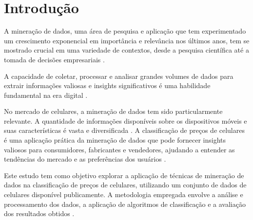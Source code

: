 \documentclass[conference]{IEEEtran}
\begin{document}









\section{Introdução}

A mineração de dados, uma área de pesquisa e aplicação que tem experimentado 
um crescimento exponencial em importância e relevância nos últimos anos, 
tem se mostrado crucial em uma variedade de contextos, 
desde a pesquisa científica até a tomada de decisões 
empresariais \cite{WikipediaDataMining}. 

A capacidade de coletar, processar e analisar grandes volumes de dados para extrair 
informações valiosas e insights significativos é uma habilidade fundamental 
na era digital \cite{Zaki2023}.

No mercado de celulares, a mineração de dados tem sido particularmente relevante. 
A quantidade de informações disponíveis sobre os dispositivos móveis e suas 
características é vasta e diversificada \cite{Statista2023}. 
A classificação de preços de celulares é uma aplicação prática da 
mineração de dados que pode fornecer insights valiosos para consumidores, 
fabricantes e vendedores, ajudando a entender as tendências do mercado e 
as preferências dos usuários \cite{Russell2016}.

Este estudo tem como objetivo explorar a aplicação de técnicas de mineração de dados 
na classificação de preços de celulares, utilizando um 
conjunto de dados de celulares disponível publicamente. 
A metodologia empregada envolve a análise e processamento dos dados, 
a aplicação de algoritmos de classificação e a 
avaliação dos resultados obtidos \cite{ScikitLearn2023}. 
\end{document}
